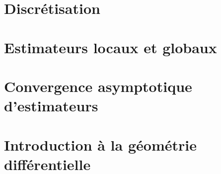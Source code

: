 %
%
%
\section{Discrétisation}
%
\section{Estimateurs locaux et globaux}
%
\section{Convergence asymptotique d'estimateurs}
%
\section{Introduction à la géométrie différentielle}
%
